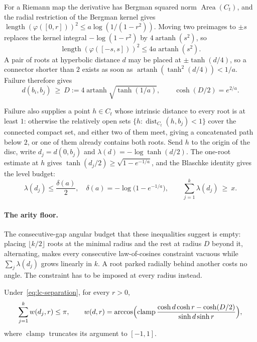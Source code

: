 \documentclass[11pt]{article}
\begin{document}
For a Riemann map the derivative has Bergman squared norm
$\operatorname{Area}(C_t)$, and the radial restriction of the Bergman kernel
gives $\operatorname{length}(\varphi([0,r]))^2\le a\log(1/(1-r^2))$.  Moving
two preimages to $\pm s$ replaces the kernel integral $-\log(1-r^2)$ by
$4\operatorname{artanh}(s^2)$, so
\[
 \operatorname{length}(\varphi([-s,s]))^2\le4a\operatorname{artanh}(s^2).
\]
A pair of roots at hyperbolic distance $d$ may be placed at $\pm\tanh(d/4)$,
so a connector shorter than $2$ exists as soon as
$\operatorname{artanh}(\tanh^2(d/4))<1/a$.  Failure therefore gives
\begin{equation}\label{eq:lc-separation}
 d(b_i,b_j)\ \ge\ D:=4\operatorname{artanh}\sqrt{\tanh(1/a)},
 \qquad \cosh(D/2)=e^{2/a}.
\end{equation}

Failure also supplies a point $h\in C_t$ whose intrinsic distance to every
root is at least $1$: otherwise the relatively open sets
$\{h:\operatorname{dist}_{C_t}(h,b_j)<1\}$ cover the connected compact set,
and either two of them meet, giving a concatenated path below $2$, or one of
them already contains both roots.  Send $h$ to the origin of the disc, write
$d_j=d(0,b_j)$ and $\lambda(d)=-\log\tanh(d/2)$.  The one-root estimate at $h$
gives $\tanh(d_j/2)\ge\sqrt{1-e^{-1/a}}$, and the Blaschke identity gives the
level budget:
\begin{equation}\label{eq:lc-radius-and-budget}
 \lambda(d_j)\le\frac{\delta(a)}2,\quad
 \delta(a)=-\log\bigl(1-e^{-1/a}\bigr),
 \qquad
 \sum_{j=1}^{k}\lambda(d_j)\ \ge\ x .
\end{equation}

\paragraph{The arity floor.}
The consecutive-gap angular budget that these inequalities suggest is empty:
placing $\lfloor k/2\rfloor$ roots at the minimal radius and the rest at
radius $D$ beyond it, alternating, makes every consecutive law-of-cosines
constraint vacuous while $\sum_j\lambda(d_j)$ grows linearly in $k$.  A root
parked radially behind another costs no angle.  The constraint has to be
imposed at every radius instead.

\begin{lemma}\label{res:circle-slice-packing}
Under~\eqref{eq:lc-separation}, for every $r>0$,
\[
 \sum_{j=1}^{k}w(d_j,r)\le\pi,\qquad
 w(d,r)=\arccos\Bigl(\operatorname{clamp}
   \frac{\cosh d\cosh r-\cosh(D/2)}{\sinh d\sinh r}\Bigr),
\]
where $\operatorname{clamp}$ truncates its argument to $[-1,1]$.
\end{lemma}
\end{document}
